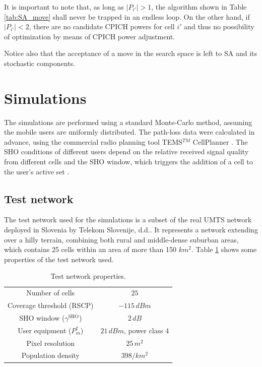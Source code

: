 It is important to note that, as long as $|P_{i'}|>1$, the algorithm
shown in Table \ref{tab:SA_move} shall never be trapped in an endless
loop. On the other hand, if $|P_{i'}|<2$, there are no candidate
CPICH powers for cell $i'$ and thus no possibility of optimization
by means of CPICH power adjustment.

Notice also that the acceptance of a move in the search space is left
to SA and its stochastic components.


\section{Simulations \label{sec:Simulations-1}}

The simulations are performed using a standard Monte-Carlo method,
assuming the mobile users are uniformly distributed. The path-loss
data were calculated in advance, using the commercial radio planning
tool TEMS$^{TM}$ CellPlanner \cite{tems}. The SHO conditions of
different users depend on the relative received signal quality from
different cells and the SHO window, which triggers the addition of
a cell to the user's active set \cite{WCDMAforUMTS_RadioAccessForThirdGenerationMobileCommunications}.


\subsection{Test network \label{sub:Test-network}}

The test network used for the simulations is a subset of the real
UMTS network deployed in Slovenia by Telekom Slovenije, d.d.. It represents
a network extending over a hilly terrain, combining both rural and
middle-dense suburban areas, which contains 25 cells within an area
of more than 150 $km^{2}$. Table \ref{tab:Test-network-properties.}
shows some properties of the test network used.



\begin{table}
\caption{Test network properties. \label{tab:Test-network-properties.}}


\centering

\begin{tabular}{c|c}
\hline 
Number of cells & $25$\tabularnewline
Coverage threshold (RSCP) & $-115\, dBm$\tabularnewline
SHO window ($\gamma^{\mathrm{SHO}}$) & $2\, dB$\tabularnewline
User equipment ($P_{m}^{\uparrow}$) & $21\, dBm$, power class 4\tabularnewline
Pixel resolution & $25\, m^{2}$\tabularnewline
Population density & $398/km^{2}$\tabularnewline
\hline 
\end{tabular}
\end{table}



